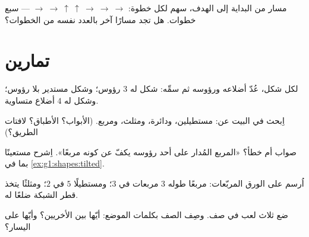 \begin{omfigure}

{\small مسار من البداية إلى الهدف، سهم لكل خطوة:
$\to\ \to\ \uparrow\ \uparrow\ \to\ \to\ \to$ --- سبع خطوات. هل
تجد مسارًا آخر بالعدد نفسه من الخطوات؟}
\end{omfigure}

\section{تمارين}

\begin{exercise}[$\star$]\label{exo:g1:shapes:1}
لكل شكل، عُدّ أضلاعه ورؤوسه ثم سمِّه: شكل له $3$ رؤوس؛ وشكل
مستدير بلا رؤوس؛ وشكل له $4$ أضلاع
متساوية.
\end{exercise}

\begin{exercise}[$\star$]\label{exo:g1:shapes:2}
اِبحث في البيت عن: مستطيلين، ودائرة، ومثلث، ومربع.
(الأبواب؟ الأطباق؟ لافتات الطريق؟)
\end{exercise}

\begin{exercise}[$\star$]\label{exo:g1:shapes:3}
صواب أم خطأ؟ «المربع المُدار على أحد رؤوسه يكفّ عن كونه
مربعًا». اِشرح مستعينًا بما في \cref{ex:g1:shapes:tilted}.
\end{exercise}

\begin{exercise}[$\star$]\label{exo:g1:shapes:4}
اُرسم على الورق المربّعات: مربعًا طوله $3$ مربعات في $3$؛ ومستطيلًا
$5$ في $2$؛ ومثلثًا يتخذ قطر الشبكة ضلعًا له.
\end{exercise}

\begin{exercise}[$\star$]\label{exo:g1:shapes:5}
ضع ثلاث لعب في صف. وصِف الصف بكلمات الموضع: أيّها بين الأخريين؟
وأيّها على اليسار؟
\end{exercise}

